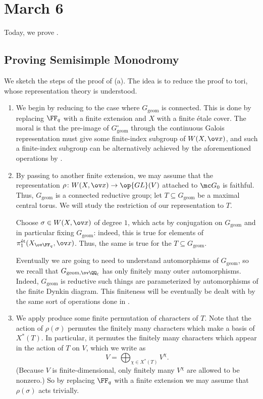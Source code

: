 \documentclass[../notes.tex]{subfiles}
\begin{document}
\section{March 6}
Today, we prove .

\subsection{Proving Semisimple Monodromy}
We sketch the steps of the proof of (a). The idea is to reduce the proof to tori, whose representation theory is understood.
\begin{enumerate}
	\item We begin by reducing to the case where $G_{\mathrm{geom}}$ is connected. This is done by replacing $\FF_q$ with a finite extension and $X$ with a finite \'etale cover. The moral is that the pre-image of $G_{\mathrm{geom}}^\circ$ through the continuous Galois representation must give some finite-index subgroup of $W(X,\ov x)$, and such a finite-index subgroup can be alternatively achieved by the aforementioned operations by .

	\item By passing to another finite extension, we may assume that the representation $\rho\colon W(X,\ov x)\to\op{GL}(V)$ attached to $\mc G_0$ is faithful. Thus, $G_{\mathrm{geom}}$ is a connected reductive group; let $T\subseteq G_{\mathrm{geom}}$ be a maximal central torus. We will study the restriction of our representation to $T$.

	Choose $\sigma\in W(X,\ov x)$ of degree $1$, which acts by conjugation on $G_{\mathrm{geom}}$ and in particular fixing $G_{\mathrm{geom}}$: indeed, this is true for elements of $\pi_1^{\mathrm{\acute et}}(X_{\ov\FF_q},\ov x)$. Thus, the same is true for the $T\subseteq G_{\mathrm{geom}}$.

	Eventually we are going to need to understand automorphisms of $G_{\mathrm{geom}}$, so we recall that $G_{\mathrm{geom},\ov\QQ_\ell}$ has only finitely many outer automorphisms. Indeed, $G_{\mathrm{geom}}$ is reductive such things are parameterized by automorphisms of the finite Dynkin diagram. This finiteness will be eventually be dealt with by the same sort of operations done in .

	\item We apply produce some finite permutation of characters of $T$. Note that the action of $\rho(\sigma)$ permutes the finitely many characters which make a basis of $X^*(T)$. In particular, it permutes the finitely many characters which appear in the action of $T$ on $V$, which we write as
	\[V=\bigoplus_{\chi\in X^*(T)}V^\chi.\]
	(Because $V$ is finite-dimensional, only finitely many $V^\chi$ are allowed to be nonzero.) So by replacing $\FF_q$ with a finite extension we may assume that $\rho(\sigma)$ acts trivially.


\end{enumerate}
\end{document}
